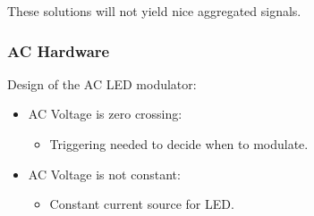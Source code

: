 \documentclass{beamer}
\begin{document}
\begin{frame}
		These solutions will not yield nice aggregated signals.
		
	\end{frame}

	\begin{frame}\frametitle{AC Hardware}

		Design of the AC LED modulator: 

		\begin{itemize}

			\item AC Voltage is zero crossing:
			\begin{itemize}
				\item Triggering needed to decide when to modulate. %
			\end{itemize}

			\item AC Voltage is not constant:
			\begin{itemize}
				\item Constant current source for LED. %
			\end{itemize}


		\end{itemize}


\end{frame}
\end{document}
